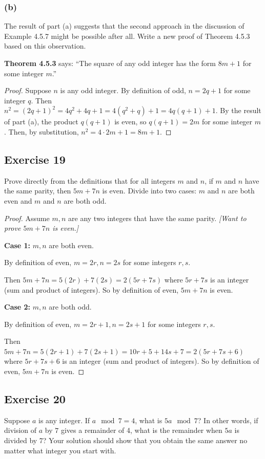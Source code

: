 \documentclass[14pt]{extarticle}
\begin{document}
\subsubsection{(b)}
The result of part (a) suggests that the second approach in the discussion of Example 4.5.7 might be possible after all. Write a new proof of Theorem 4.5.3 based on this observation.

{\bf Theorem 4.5.3} says: ``The square of any odd integer has the form $8m + 1$ for some integer $m$.''

\begin{proof}
Suppose $n$ is any odd integer. By definition of odd, $n = 2q + 1$ for some integer $q$. Then $n^2 = (2q + 1)^2 = 4q^2 + 4q + 1 = 4(q^2 + q) + 1 = 4q(q + 1) + 1$. By the result of part (a), the product $q(q + 1)$ is even, so $q(q + 1) = 2m$ for some integer $m$. Then, by substitution, $n^2 = 4\cdot2m + 1 = 8m + 1$.
\end{proof}

\subsection{Exercise 19}
Prove directly from the definitions that for all integers $m$ and $n$, if $m$ and $n$ have the same parity, then $5m + 7n$ is even. Divide into two cases: $m$ and $n$ are both even and $m$ and $n$ are both odd.

\begin{proof}
Assume $m, n$ are any two integers that have the same parity. {\it [Want to prove $5m+7n$ is even.]}

{\bf Case 1:} $m,n$ are both even.

By definition of even, $m = 2r, n = 2s$ for some integers $r, s$.

Then $5m+7n = 5(2r) + 7(2s) = 2(5r + 7s)$ where $5r + 7s$ is an integer (sum and product of integers). So by definition of even, $5m+7n$ is even.

{\bf Case 2:} $m,n$ are both odd.

By definition of even, $m = 2r+1, n = 2s+1$ for some integers $r, s$.

Then $5m+7n = 5(2r+1) + 7(2s+1) = 10r+5+14s+7 = 2(5r+7s+6)$ where $5r+7s+6$ is an integer (sum and product of integers). So by definition of even, $5m+7n$ is even.
\end{proof}

\subsection{Exercise 20}
Suppose $a$ is any integer. If $a \mod 7 = 4$, what is $5a \mod 7$? In other words, if division of $a$ by $7$ gives a remainder of 4, what is the remainder when $5a$ is divided by 7? Your solution should show that you obtain the same answer no matter what integer you start with.
\end{document}
